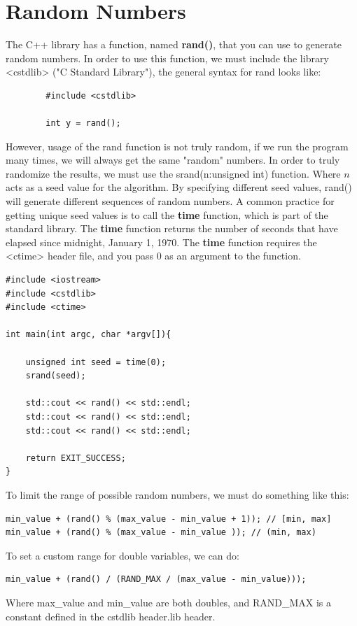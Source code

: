 \documentclass{report}
\begin{document}
    \section{\LARGE Random Numbers}
    \bigbreak \noindent 
    The C++ library has a function, named \textbf{rand()}, that you can use to generate random numbers. In order to use this function, we must include the library <cstdlib> ("C Standard Library"), the general syntax for rand looks like:
    \smallbreak \noindent
    \sepline
    \begin{verbatim}
        #include <cstdlib>
        
        int y = rand();
    \end{verbatim}
    \sepline
    \bigbreak \noindent 
    However, usage of the rand function is not truly random, if we run the program many times, we will always get the same "random" numbers. In order to truly randomize the results, we must use the srand(n:unsigned int) function. Where $n$ acts as a seed value for the algorithm. By specifying different seed values, rand() will generate different sequences of random numbers.
    \bigbreak \noindent 
    A common practice for getting unique seed values is to call the \textbf{time} function, which is part of the standard library. The \textbf{time} function returns the number of seconds that have elapsed since midnight, January 1, 1970. The \textbf{time} function requires the <ctime> header file, and you pass 0 as an argument to the function.
    \smallbreak \noindent
    \sepline
    \begin{verbatim}
#include <iostream>
#include <cstdlib>
#include <ctime>

int main(int argc, char *argv[]){

    unsigned int seed = time(0);
    srand(seed);

    std::cout << rand() << std::endl; 
    std::cout << rand() << std::endl; 
    std::cout << rand() << std::endl; 

    return EXIT_SUCCESS;
}
    \end{verbatim}
    \sepline
    \bigbreak \noindent 
    To limit the range of possible random numbers, we must do something like this:
    \smallbreak \noindent
    \sepline
    \begin{verbatim} 
min_value + (rand() % (max_value - min_value + 1)); // [min, max]
min_value + (rand() % (max_value - min_value )); // (min, max)
    \end{verbatim}
    \sepline
    \bigbreak \noindent 
    To set a custom range for double variables, we can do:
    \bigbreak \noindent 
    \sepline
    \begin{verbatim}
min_value + (rand() / (RAND_MAX / (max_value - min_value)));
    \end{verbatim}
    \sepline
    \bigbreak \noindent 
    Where max\_value and min\_value are both doubles, and RAND\_MAX is a constant defined in the cstdlib header.lib header.
\end{document}
